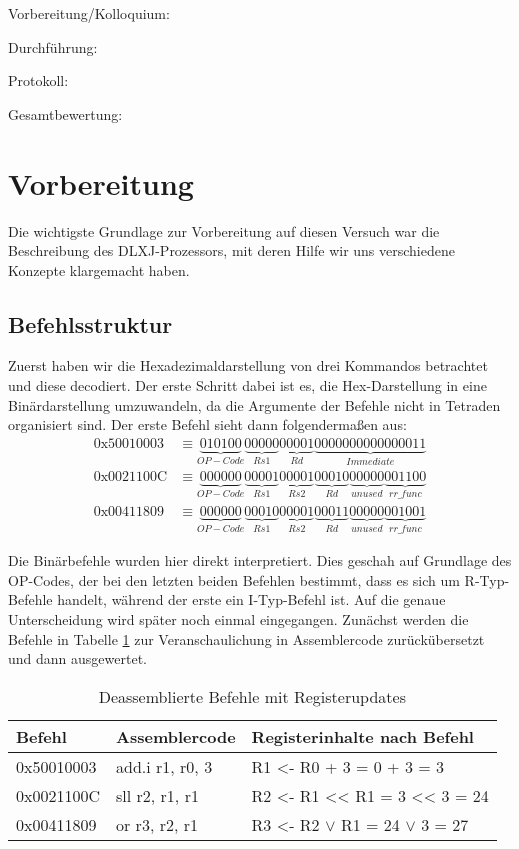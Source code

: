 \documentclass[12pt,a4paper]{scrartcl}
\begin{document}
Vorbereitung/Kolloquium:

Durchf\"uhrung:

Protokoll:

Gesamtbewertung:
\clearpage



\section{Vorbereitung}
Die wichtigste Grundlage zur Vorbereitung auf diesen Versuch war die Beschreibung des DLXJ-Prozessors, mit deren Hilfe wir uns verschiedene Konzepte klargemacht haben.

\subsection*{Befehlsstruktur}
Zuerst haben wir die Hexadezimaldarstellung von drei Kommandos betrachtet und diese decodiert.
Der erste Schritt dabei ist es, die Hex-Darstellung in eine Bin\"ardarstellung umzuwandeln, da die Argumente der Befehle nicht in Tetraden organisiert sind.
Der erste Befehl sieht dann folgenderma\ss en aus:
\begin{align*}
\text{0x50010003} & \equiv \underbrace{010100}_{OP-Code}\underbrace{00000}_{Rs1}\underbrace{00001}_{Rd}\underbrace{0000000000000011}_{Immediate} \\
\text{0x0021100C} & \equiv \underbrace{000000}_{OP-Code}\underbrace{00001}_{Rs1}\underbrace{00001}_{Rs2}\underbrace{00010}_{Rd}\underbrace{00000}_{unused}\underbrace{001100}_{rr\_func} \\
\text{0x00411809} & \equiv \underbrace{000000}_{OP-Code}\underbrace{00010}_{Rs1}\underbrace{00001}_{Rs2}\underbrace{00011}_{Rd}\underbrace{00000}_{unused}\underbrace{001001}_{rr\_func}
\end{align*}

Die Bin\"arbefehle wurden hier direkt interpretiert.
Dies geschah auf Grundlage des OP-Codes, der bei den letzten beiden Befehlen bestimmt, dass es sich um R-Typ-Befehle handelt, w\"ahrend der erste ein I-Typ-Befehl ist.
Auf die genaue Unterscheidung wird sp\"ater noch einmal eingegangen.
Zun\"achst werden die Befehle in Tabelle \ref{tab:vorbinstr} zur Veranschaulichung in Assemblercode zur\"uck\"ubersetzt und dann ausgewertet.

\begin{table}[h]
    \centering
    \begin{tabular}{l|l|l}
    \hline
    Befehl      & Assemblercode     & Registerinhalte nach Befehl           \\
    \hline
    0x50010003  & add.i r1, r0, 3   & R1 <- R0 + 3 = 0 + 3 = 3              \\
    0x0021100C  & sll   r2, r1, r1  & R2 <- R1 << R1 = 3 << 3 = 24          \\
    0x00411809  & or    r3, r2, r1  & R3 <- R2 $\vee$ R1 = 24 $\vee$ 3 = 27 \\
    \hline
    \end{tabular}
    \caption{Deassemblierte Befehle mit Registerupdates}
    \label{tab:vorbinstr}
\end{table}
\end{document}
